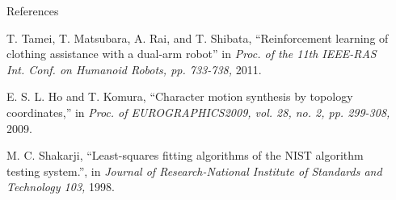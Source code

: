 \documentclass[final,hyperref={pdfpagelabels=false}]{beamer}
\begin{document}
\begin{frame}[t]
\begin{columns}[t]
\begin{column}{0.47\textwidth}
\begin{block}{References}

\nocite{*}
\scriptsize{


\begin{thebibliography}{10}
T. Tamei, T. Matsubara, A. Rai, and T. Shibata, ``Reinforcement learning of clothing assistance with a dual-arm robot'' in \emph{Proc. of the 11th IEEE-RAS Int. Conf. on Humanoid Robots, pp. 733-738,} 2011.

E. S. L. Ho and T. Komura, ``Character motion synthesis by topology coordinates,'' in \emph{Proc. of EUROGRAPHICS2009, vol. 28, no. 2, pp. 299-308,} 2009.

M. C. Shakarji, ``Least-squares fitting algorithms of the NIST algorithm testing system.'', in \emph{Journal of Research-National Institute of Standards and Technology 103,} 1998.
\end{thebibliography}}

\end{block}

\end{column}

\begin{column}{.02\textwidth}\end{column}

\end{columns}

\end{frame}
\end{document}

